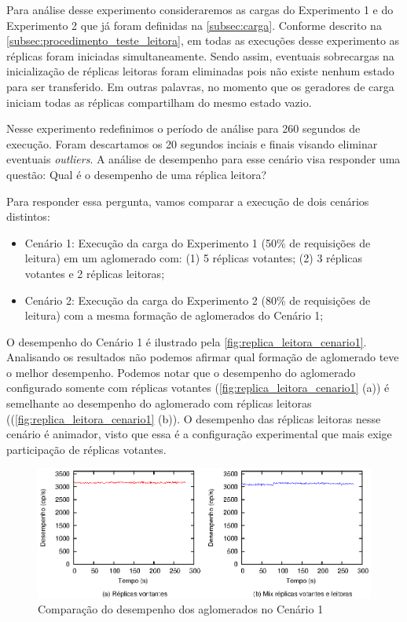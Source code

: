 Para análise desse experimento consideraremos as cargas do Experimento 1 e do Experimento
2 que já foram definidas na \autoref{subsec:carga}. Conforme descrito na
\autoref{subsec:procedimento_teste_leitora}, em todas as execuções desse experimento as
réplicas foram iniciadas simultaneamente. Sendo assim, eventuais sobrecargas na
inicialização de réplicas leitoras foram eliminadas pois não existe nenhum estado para ser
transferido. Em outras palavras, no momento que os geradores de carga iniciam todas as
réplicas compartilham do mesmo estado vazio.

Nesse experimento redefinimos o período de análise para 260 segundos de execução. Foram
descartamos os 20 segundos inciais e finais visando eliminar eventuais \emph{outliers}. A
análise de desempenho para esse cenário visa responder uma questão: Qual é o desempenho de
uma réplica leitora?

Para responder essa pergunta, vamos comparar a execução de dois cenários distintos:

\begin{itemize}
  \item Cenário 1: Execução da carga do Experimento 1 (50\% de requisições de leitura)
    em um aglomerado com: (1) 5 réplicas votantes; (2) 3 réplicas votantes e 2 réplicas
    leitoras;
  \item Cenário 2: Execução da carga do Experimento 2 (80\% de requisições de leitura)
    com a mesma formação de aglomerados do Cenário 1;
\end{itemize}

O desempenho do Cenário 1 é ilustrado pela \autoref{fig:replica_leitora_cenario1}.
Analisando os resultados não podemos afirmar qual formação de aglomerado teve o melhor
desempenho. Podemos notar que o desempenho do aglomerado configurado somente com réplicas
votantes (\autoref{fig:replica_leitora_cenario1} (a)) é semelhante ao desempenho do
aglomerado com réplicas leitoras ((\autoref{fig:replica_leitora_cenario1} (b)). O
desempenho das réplicas leitoras nesse cenário é animador, visto que essa é a configuração
experimental que mais exige participação de réplicas votantes.

\begin{figure}[ht]
  \centering
  \includegraphics[width=14cm]{conteudo/capitulos/figuras/final-replica-leitora-pr50.eps}
  \caption{Comparação do desempenho dos aglomerados no Cenário 1}
  \label{fig:replica_leitora_cenario1}
\end{figure}

